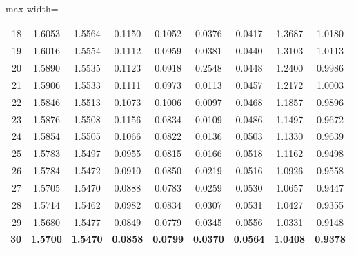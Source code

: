 \documentclass[11pt,a4paper]{article}
\begin{document}
\begin{table}[htbp]
\begin{adjustbox}{max width=\textwidth}
\begin{tabular}{r c c c c c c c c}
18 & 1.6053 & 1.5564 & 0.1150 & 0.1052 & 0.0376 & 0.0417 & 1.3687 & 1.0180 \\
19 & 1.6016 & 1.5554 & 0.1112 & 0.0959 & 0.0381 & 0.0440 & 1.3103 & 1.0113 \\
20 & 1.5890 & 1.5535 & 0.1123 & 0.0918 & 0.2548 & 0.0448 & 1.2400 & 0.9986 \\
21 & 1.5906 & 1.5533 & 0.1111 & 0.0973 & 0.0113 & 0.0457 & 1.2172 & 1.0003 \\
22 & 1.5846 & 1.5513 & 0.1073 & 0.1006 & 0.0097 & 0.0468 & 1.1857 & 0.9896 \\
23 & 1.5876 & 1.5508 & 0.1156 & 0.0834 & 0.0109 & 0.0486 & 1.1497 & 0.9672 \\
24 & 1.5854 & 1.5505 & 0.1066 & 0.0822 & 0.0136 & 0.0503 & 1.1330 & 0.9639 \\
25 & 1.5783 & 1.5497 & 0.0955 & 0.0815 & 0.0166 & 0.0518 & 1.1162 & 0.9498 \\
26 & 1.5784 & 1.5472 & 0.0910 & 0.0850 & 0.0219 & 0.0516 & 1.0926 & 0.9558 \\
27 & 1.5705 & 1.5470 & 0.0888 & 0.0783 & 0.0259 & 0.0530 & 1.0657 & 0.9447 \\
28 & 1.5714 & 1.5462 & 0.0982 & 0.0834 & 0.0307 & 0.0531 & 1.0427 & 0.9355 \\
29 & 1.5680 & 1.5477 & 0.0849 & 0.0779 & 0.0345 & 0.0556 & 1.0331 & 0.9148 \\
\textbf{30} & \textbf{1.5700} & \textbf{1.5470} & \textbf{0.0858} & \textbf{0.0799} & \textbf{0.0370} & \textbf{0.0564} & \textbf{1.0408} & \textbf{0.9378} \\
\bottomrule
\end{tabular}
\end{adjustbox}
\end{table}

\clearpage
\end{document}
